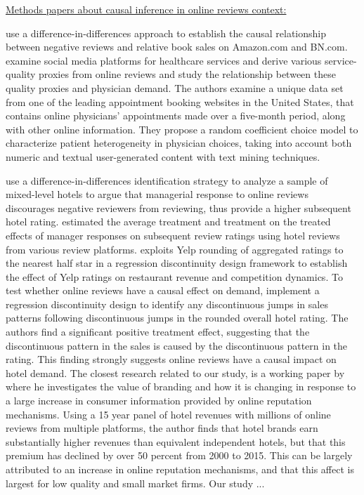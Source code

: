 \underline{Methods papers about causal inference in online reviews context:}

\citet{chevalier2006effect} use a difference-in-differences approach to establish the causal relationship between negative reviews and relative book sales on Amazon.com and BN.com. \citet{xu2017doctordemand} examine social media platforms for healthcare services and derive various service-quality proxies from online reviews and study the relationship between these quality proxies and physician demand. The authors examine a unique data set from one of the leading appointment booking websites in the United States, that contains online physicians' appointments made over a five-month period, along with other online information. They propose a random coefficient choice model to characterize patient heterogeneity in physician choices, taking into account both numeric and textual user-generated content with text mining techniques.

\citet{proserpio2017online} use a difference-in-differences identification strategy to analyze a sample of mixed-level hotels to argue that managerial response to online reviews discourages negative reviewers from reviewing, thus provide a higher subsequent hotel rating. \citet{wang2018and} estimated the average treatment and treatment on the treated effects of manager responses on subsequent review ratings using hotel reviews from various review platforms. \citet{luca2011reviews} exploits Yelp rounding of aggregated ratings to the nearest half star in a regression discontinuity design framework to establish the effect of Yelp ratings on restaurant revenue and competition dynamics. To test whether online reviews have a causal effect on demand, \citet{ghose2012designing} implement a regression discontinuity design to identify any discontinuous jumps in sales patterns following discontinuous jumps in the rounded overall hotel rating. The authors find a significant positive treatment effect, suggesting that the discontinuous pattern in the sales is caused by the discontinuous pattern in the rating. This finding strongly suggests online reviews have a causal impact on hotel demand.  The closest research related to our study, is a working paper by \citet{hollenbeck2017online} where he investigates the value of branding and how it is changing in response to a large increase in consumer information provided by online reputation mechanisms. Using a 15 year panel of hotel revenues with millions of online reviews from multiple platforms, the author finds that hotel brands earn substantially higher revenues than equivalent independent hotels, but that this premium has declined by over 50 percent from 2000 to 2015. This can be largely attributed to an increase in online reputation mechanisms, and that this affect is largest for low quality and small market firms. Our study ...

